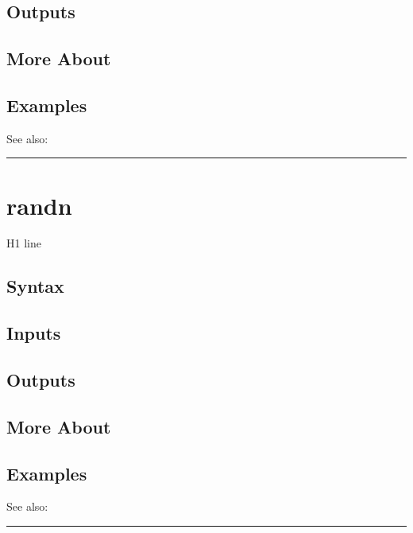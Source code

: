 \documentclass[letterpaper,10pt,english]{sphinxmanual}
\begin{document}
\subsection{Outputs}
\label{classes/time_series/@ts/ts:id466}

\subsection{More About}
\label{classes/time_series/@ts/ts:id467}

\subsection{Examples}
\label{classes/time_series/@ts/ts:id468}
See also:


\bigskip\hrule{}\bigskip



\section{randn}
\label{classes/time_series/@ts/ts:id469}\label{classes/time_series/@ts/ts:randn}
H1 line


\subsection{Syntax}
\label{classes/time_series/@ts/ts:id470}

\subsection{Inputs}
\label{classes/time_series/@ts/ts:id471}

\subsection{Outputs}
\label{classes/time_series/@ts/ts:id472}

\subsection{More About}
\label{classes/time_series/@ts/ts:id473}

\subsection{Examples}
\label{classes/time_series/@ts/ts:id474}
See also:


\bigskip\hrule{}\bigskip
\end{document}
